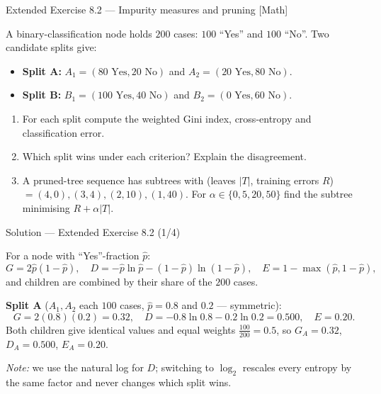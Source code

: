 \documentclass[aspectratio=169,11pt]{beamer}
\begin{document}
\begin{frame}{Extended Exercise 8.2 --- Impurity measures and pruning [Math]}
\begin{longexercise}
A binary-classification node holds $200$ cases: $100$ ``Yes'' and $100$ ``No''. Two candidate splits give:
\begin{itemize}
  \item \textbf{Split A:} $A_1=(80\text{ Yes},20\text{ No})$ and $A_2=(20\text{ Yes},80\text{ No})$.
  \item \textbf{Split B:} $B_1=(100\text{ Yes},40\text{ No})$ and $B_2=(0\text{ Yes},60\text{ No})$.
\end{itemize}
\begin{enumerate}
  \item For each split compute the weighted Gini index, cross-entropy and classification error.
  \item Which split wins under each criterion? Explain the disagreement.
  \item A pruned-tree sequence has subtrees with (leaves $|T|$, training errors $R$) $=(4,0),(3,4),(2,10),(1,40)$. For $\alpha\in\{0,5,20,50\}$ find the subtree minimising $R+\alpha|T|$.
\end{enumerate}
\end{longexercise}
\end{frame}

\begin{frame}{Solution --- Extended Exercise 8.2 (1/4)}
\begin{solutionbox}
For a node with ``Yes''-fraction $\hat p$:
\[ G=2\hat p(1-\hat p),\quad D=-\hat p\ln\hat p-(1-\hat p)\ln(1-\hat p),\quad E=1-\max(\hat p,1-\hat p), \]
and children are combined by their share of the $200$ cases.

\medskip
\textbf{Split A} ($A_1,A_2$ each $100$ cases, $\hat p=0.8$ and $0.2$ --- symmetric):
\[ G=2(0.8)(0.2)=0.32,\quad D=-0.8\ln0.8-0.2\ln0.2=0.500,\quad E=0.20. \]
Both children give identical values and equal weights $\tfrac{100}{200}=0.5$, so $G_A=0.32$, $D_A=0.500$, $E_A=0.20$.

\medskip
\emph{Note:} we use the natural log for $D$; switching to $\log_2$ rescales every entropy by the same factor and never changes which split wins.
\end{solutionbox}
\end{frame}
\end{document}
